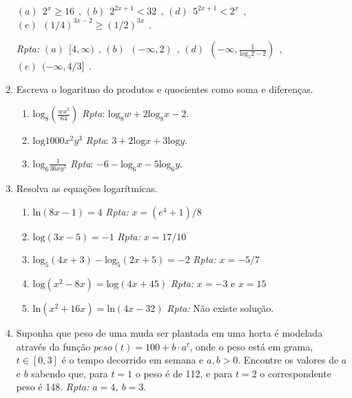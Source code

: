\documentclass[11pt]{article}
\begin{document}
\begin{enumerate}
      $(a) \ \ 2^{x}\geq 16 \ \ $,  
      $(b) \ \ 2^{2x+1}< 32 \ \ $,       
      $(d) \ \ 5^{2x+1}< 2^{x} \ \ $,
      $(e) \ \ (1/4)^{3x-2}\geq (1/2)^{3x} \ \ $.   
      
      {\it Rpta: } 
      $(a) \ \ [4, \infty)  \ \ $,  
      $(b) \ \ (-\infty, 2) \ \ $,  
      $(d) \ \ (-\infty, \frac{1}{\text{log}_{5}2-2}) \ \ $,
      $(e) \ \ (-\infty, 4/3] \ \ $.  
      \item Escreva o logaritmo do produtos e quocientes
      como soma e diferenças. 
         \begin{enumerate}
         	\item $\text{log}_{8}(\frac{wx^{2}}{64})$
         	      \hfill {\it Rpta}: 
         	      $\text{log}_{8} w+2\text{log}_{8}x-2$.    
            \item $\text{log} 1000x^{2}y^{3}$
          	      \hfill {\it Rpta}: $3+2\text{log}x+3\text{log}y$.
          	\item $\text{log}_{6} \frac{1}{36 xy^{5}}$
          	      \hfill {\it Rpta}: $-6-\text{log}_{6}x-5\text{log}_{6}y$.       
         \end{enumerate}
     \item Resolva as equações logarítmicas.
         \begin{enumerate}
         	\item $\text{ln}(8x-1)=4$
         	      \hfill {\it Rpta:}
         	      $x=(e^{4}+1)/8$
         	\item  $\text{log}(3x-5)=-1$
         	       \hfill {\it Rpta:}
         	      $x=17/10$
         	\item  $\text{log}_{5}(4x+3)-\text{log}_{5}(2x+5)=-2$
         	       \hfill {\it Rpta: } 
         	       $x=-5/7$
         	\item  $\text{log} (x^{2}-8x)=\text{log}(4x+45)$
         	       \hfill {\it Rpta:}
         	       $x=-3$ e $x=15$
         	\item  $\text{ln} (x^{2}+16x)=\text{ln}(4x-32)$
         	       \hfill {\it Rpta:} Não existe solução.        
         \end{enumerate}
               
     \item Suponha que peso de uma muda ser plantada em uma horta é modelada através da função $peso(t)=100+b\cdot a^{t}$, onde o peso está em grama, $t \in [0,3]$ é o tempo decorrido em semana e $a, b>0$.
     Encontre os valores de $a$ e $b$ sabendo que, para $t=1$
     o peso é de 112, e para $t=2$ o correspondente peso é 148. 
     {\it Rpta: $a=4$, $b=3$}. 
     

\end{enumerate}
\end{document}
